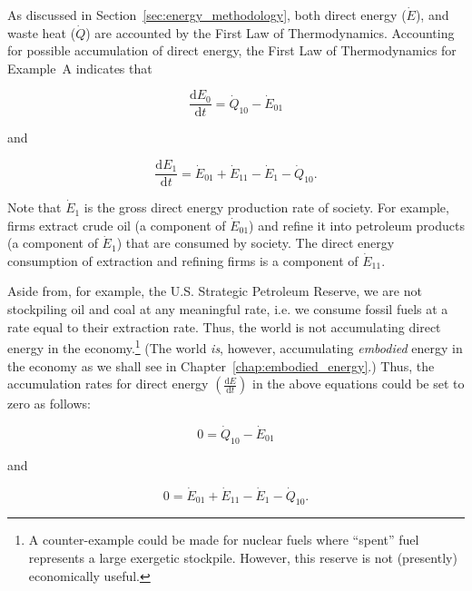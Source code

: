 As discussed in Section~\ref{sec:energy_methodology}, 
both direct energy ($\dot{E}$), and waste heat ($\dot{Q}$) 
are accounted by the First Law of Thermodynamics. 
Accounting for possible accumulation of direct energy, 
the First Law of Thermodynamics for Example~A indicates that

\begin{equation} \label{eq:dE_0/dt_single_sector}
	\frac{\mathrm{d}E_0}{\mathrm{d}t} 
	= \dot{Q}_{10} 
	- \dot{E}_{01}
\end{equation}

\noindent and

\begin{equation} \label{eq:dE_1/dt_single_sector}
	\frac{\mathrm{d}E_{1}}{\mathrm{d}t} 
	= \dot{E}_{01} 
	+ \dot{E}_{11}
	- \dot{E}_{1}
	- \dot{Q}_{10}.
\end{equation}

Note that $\dot{E}_{1}$ is the gross direct energy production rate
of society. 
For example, firms extract crude oil (a component of $\dot{E}_{01}$) 
and refine it into petroleum products (a component of $\dot{E}_{1}$)
that are consumed by society.
The direct energy consumption of extraction and refining firms 
is a component of $\dot{E}_{11}$.

Aside from, for example, the U.S. 
Strategic Petroleum Reserve, 
we are not stockpiling oil and coal at any meaningful rate, 
i.e. we consume fossil fuels at a rate equal to their extraction rate. 
Thus, the world is not accumulating direct energy 
in the economy.\footnote{A counter-example could be made 
for nuclear fuels where ``spent'' fuel represents a large exergetic stockpile. 
However, this reserve is not (presently) economically useful.} 
(The world \emph{is}, however, 
accumulating \emph{embodied} energy 
in the economy as we shall see 
in Chapter~\ref{chap:embodied_energy}.) 
Thus, the accumulation rates for direct energy 
$\left( \frac{\mathrm{d}E}{\mathrm{d}t} \right)$ in the above equations 
could be set to zero as follows:

\begin{equation} \label{eq:biosphere_direct_energy_steady_state}
	0 
	= \dot{Q}_{10} 
	- \dot{E}_{01}
\end{equation}

\noindent and

\begin{equation} \label{eq:single_sector_direct_energy_steady_state}
	0 
	= \dot{E}_{01} 
	+ \dot{E}_{11}
	- \dot{E}_{1} 
	- \dot{Q}_{10}.
\end{equation}

